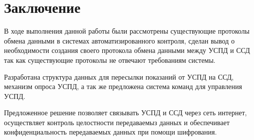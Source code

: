 \newpage
\section{Заключение}
\setcounter{figure}{0}

В ходе выполнения данной работы были рассмотрены существующие протоколы обмена данными в системах автоматизированного контроля, сделан вывод о необходимости создания своего протокола обмена данными между УСПД и ССД так как существующие протоколы не отвечают требованиям системы. 

Разработана структура данных для пересылки показаний от УСПД на ССД, механизм опроса УСПД, а так же предложена система команд для управления УСПД.


Предложенное решение позволяет связывать УСПД и ССД через сеть интернет, осуществляет контроль целостности передаваемыз данных и обеспечивает конфиденциальность передаваемых данных при помощи шифрования.

